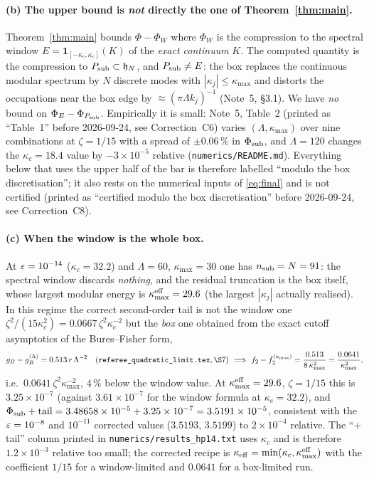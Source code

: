 \documentclass[11pt]{article}
\providecommand{\one}{\mathbf 1}\providecommand{\CAR}{\mathrm{CAR}}\providecommand{\Ran}{\operatorname{Ran}}\providecommand{\dist}{\operatorname{dist}}\providecommand{\norm}[1]{\lVert #1\rVert}
\begin{document}
\paragraph{(b) The upper bound is \emph{not} directly the one of Theorem~\ref{thm:main}.}
Theorem~\ref{thm:main} bounds $\Phi-\Phi_W$ where $\Phi_W$ is the compression to the spectral window
$E=\one_{[-\kappa_c,\kappa_c]}(K)$ of the \emph{exact continuum} $K$.  The computed quantity is the
compression to $P_{\rm sub}\subset\mathfrak h_N$, and $P_{\rm sub}\ne E$: the box replaces the
continuous modular spectrum by $N$ discrete modes with $|\kappa_j|\le\kappa_{\max}$ and distorts the
occupations near the box edge by $\approx(\pi\Lambda k_j)^{-1}$ (Note~5, \S3.1).  We have \emph{no}
bound on $\Phi_E-\Phi_{P_{\rm sub}}$.  Empirically it is small: Note~5, Table~2 (printed as ``Table~1'' before 2026-09-24, see Correction~C6) varies
$(\Lambda,\kappa_{\max})$ over nine combinations at $\zeta=1/15$ with a spread of $\pm0.06\,\%$ in
$\Phi_{\rm sub}$, and $\Lambda=120$ changes the $\kappa_c=18.4$ value by $-3\times10^{-5}$ relative
(\texttt{numerics/README.md}).  Everything below that uses the upper half of the bar is therefore
labelled ``modulo the box discretisation''; it also rests on the numerical inputs of \eqref{eq:final} and is not certified (printed as ``certified modulo the box discretisation'' before 2026-09-24, see Correction~C8).

\paragraph{(c) When the window is the whole box.}
At $\varepsilon=10^{-14}$ ($\kappa_c=32.2$) and $\Lambda=60$, $\kappa_{\max}=30$ one has
$n_{\rm sub}=N=91$: the spectral window discards \emph{nothing}, and the residual truncation is the
box itself, whose largest modular energy is $\kappa_{\max}^{\rm eff}=29.6$ (the largest $|\kappa_j|$
actually realised).  In this regime the correct second-order tail is not the window one
$\zeta^2/(15\kappa_c^2)=0.0667\,\zeta^2\kappa_c^{-2}$ but the \emph{box} one obtained from the exact
cutoff asymptotics of the Bures--Fisher form,
\begin{equation}\label{eq:boxtail}
 g_B-g_B^{(\Lambda)}=0.513\,r\,\Lambda^{-2}\quad(\texttt{referee\_quadratic\_limit.tex}, \S7)
 \ \Longrightarrow\
 f_2-f_2^{(\kappa_{\max})}=\frac{0.513}{8\,\kappa_{\max}^2}=\frac{0.0641}{\kappa_{\max}^2},
\end{equation}
i.e.\ $0.0641\,\zeta^2\kappa_{\max}^{-2}$, $4\,\%$ below the window value.  At
$\kappa_{\max}^{\rm eff}=29.6$, $\zeta=1/15$ this is $3.25\times10^{-7}$ (against
$3.61\times10^{-7}$ for the window formula at $\kappa_c=32.2$), and
$\Phi_{\rm sub}+{\rm tail}=3.48658\times10^{-5}+3.25\times10^{-7}=3.5191\times10^{-5}$,
consistent with the $\varepsilon=10^{-8}$ and $10^{-11}$ corrected values ($3.5193$, $3.5199$) to
$2\times10^{-4}$ relative.  The ``$+$tail'' column printed in
\texttt{numerics/results\_hp14.txt} uses $\kappa_c$ and is therefore $1.2\times10^{-3}$ relative too
small; the corrected recipe is $\kappa_{\rm eff}=\min(\kappa_c,\kappa_{\max}^{\rm eff})$ with the
coefficient $1/15$ for a window-limited and $0.0641$ for a box-limited run.
\end{document}

